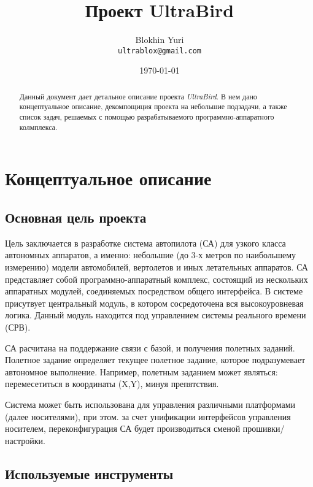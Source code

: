 \documentclass[utf8]{report}
\begin{document}
 
\title{Проект UltraBird}
\author{Blokhin Yuri\\
        \texttt{ultrablox@gmail.com}}
\date{\today}
\maketitle
 
\tableofcontents

\begin{abstract}
Данный документ дает детальное описание проекта \textit{UltraBird}. В нем дано концептуальное описание, декомпощиция проекта на небольшие подзадачи, а также список задач, решаемых с помощью разрабатываемого программно-аппаратного колмплекса.
\end{abstract}

\chapter{Концептуальное описание}

\section{Основная цель проекта}
Цель заключается в разработке система автопилота (СА) для узкого класса автономных аппаратов, а именно: небольшие (до 3-х метров по наибольшему измерению) модели автомобилей, вертолетов и иных летательных аппаратов. СА представляет собой программно-аппаратный комплекс, состоящий из нескольких аппаратных модулей, соединяемых посредством общего интерфейса. В системе присутвует центральный модуль, в котором сосредоточена вся высокоуровневая логика. Данный модуль находится под управлением системы реального времени (СРВ).

СА расчитана на поддержание связи с базой, и получения полетных заданий. Полетное задание определяет текущее полетное задание, которое подразумевает автономное выполнение. Например, полетным заданием может являться: перемесетиться в координаты (X,Y), минуя препятствия.

Система может быть использована для управления различными платформами (далее носителями), при этом. за счет унификации интерфейсов управления носителем, переконфигурация СА будет производиться сменой прошивки/настройки.

\section{Используемые инструменты}
\end{document}
